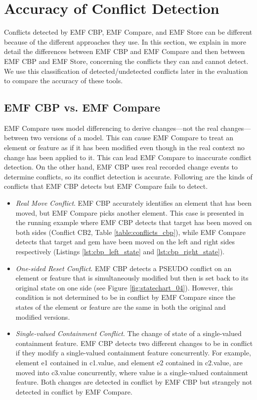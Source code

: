\section{Accuracy of Conflict Detection}
\label{sec:accuracy_of_conflict_detection}
Conflicts detected by EMF CBP, EMF Compare, and EMF Store can be different because of the different approaches they use. In this section, we explain in more detail the differences between EMF CBP and EMF Compare and then between EMF CBP and EMF Store, concerning the conflicts they can and cannot detect. We use this classification of detected/undetected conflicts later in the evaluation to compare the accuracy of these tools.

\subsection{EMF CBP vs. EMF Compare}
\label{sec:emf_cbp_vs_emf_compare}
EMF Compare uses model differencing to derive changes—not the real changes—between two versions of a model. This can cause EMF Compare to treat an element or feature as if it has been modified even though in the real context no change has been applied to it. This can lead EMF Compare to inaccurate conflict detection. On the other hand, EMF CBP uses real recorded change events to determine conflicts, so its conflict detection is accurate. Following are the kinds of conflicts that EMF CBP detects but EMF Compare fails to detect.
\begin{itemize}
  
  \item \emph{Real Move Conflict}. EMF CBP accurately identifies an element that has been moved, but EMF Compare picks another element. This case is presented in the running example where EMF CBP detects that \textsf{target} has been moved on both sides (Conflict CB2, Table \ref{table:conflicts_cbp}), while EMF Compare detects that \textsf{target} and \textsf{gem} have been moved on the left and right sides respectively (Listings \ref{lst:cbp_left_state} and \ref{lst:cbp_right_state}).
  
  \item \emph{One-sided Reset Conflict}. EMF CBP detects a \textsf{PSEUDO} conflict on an element or feature that is simultaneously modified but then is set back to its original state on one side (see Figure \ref{fig:statechart_04}). However, this condition is not determined to be in conflict by EMF Compare since the states of the element or feature are the same in both the original and modified versions.
  
  \item \emph{Single-valued Containment Conflict}. The change of state of a single-valued containment feature. EMF CBP detects two different changes to be in conflict if they modify a single-valued containment feature concurrently. For example, element \textsf{e1} contained in \textsf{c1}.\textsf{value}, and element \textsf{e2} contained in \textsf{c2}.\textsf{value}, are moved into \textsf{c3}.\textsf{value} concurrently, where \textsf{value} is a single-valued containment feature. Both changes are detected in conflict by EMF CBP but strangely not detected in conflict by EMF Compare.
\end{itemize}


